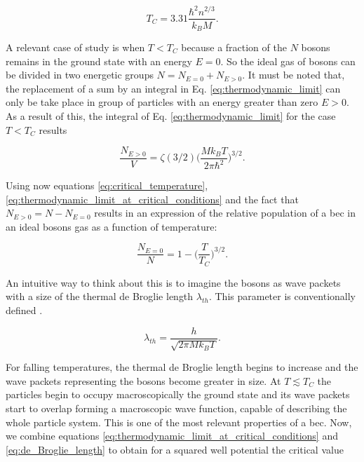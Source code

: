 \begin{equation}\label{eq:critical_temperature}
T_C = 3.31 \frac{\hbar^2 n^{2/3}}{k_B M}.
\end{equation}

A relevant case of study is when $T < T_C$ because a fraction of the $N$ bosons remains in the ground state with an energy $E = 0$. So the ideal gas of bosons can be divided in two energetic groups $N = N_{E=0} + N_{E>0}$. It must be noted that, the replacement of a sum by an integral in Eq. \eqref{eq:thermodynamic_limit} can only be take place in group of particles with an energy greater than zero $E>0$. As a result of this, the integral of Eq. \eqref{eq:thermodynamic_limit} for the case $T < T_C$ results

\begin{equation}\label{eq:thermodynamic_limit_low_T}
\frac{N_{E>0}}{V} = \zeta(3/2) \bigg(\frac{M k_B T}{2 \pi \hbar^2}\bigg)^{3/2}.
\end{equation}

Using now equations \eqref{eq:critical_temperature}, \eqref{eq:thermodynamic_limit_at_critical_conditions} and the fact that $N_{E>0} = N - N_{E=0}$ results in an expression of the relative population of a \ac{bec} in an ideal bosons gas as a function of temperature:

\begin{equation}\label{eq:bec_relative_population}
\frac{N_{E=0}}{N} = 1 - \bigg(\frac{T}{T_C}\bigg)^{3/2}.
\end{equation}

An intuitive way to think about this is to imagine the bosons as wave packets with a size of the thermal de Broglie length $\lambda_{th}$. This parameter is conventionally defined \cite{deBroglie1970}.

\begin{equation}\label{eq:de_Broglie_length}
\lambda_{th} = \frac{h}{\sqrt{2\pi Mk_B T}}.
\end{equation}

For falling temperatures, the thermal de Broglie length begins to increase and the wave packets representing the bosons become greater in size. At $T\lesssim T_C$ the particles begin to occupy macroscopically the ground state and its wave packets start to overlap forming a macroscopic wave function, capable of describing the whole particle system. This is one of the most relevant properties of a \ac{bec}. Now, we combine equations \ref{eq:thermodynamic_limit_at_critical_conditions} and \ref{eq:de_Broglie_length} to obtain for a squared well potential the critical value

